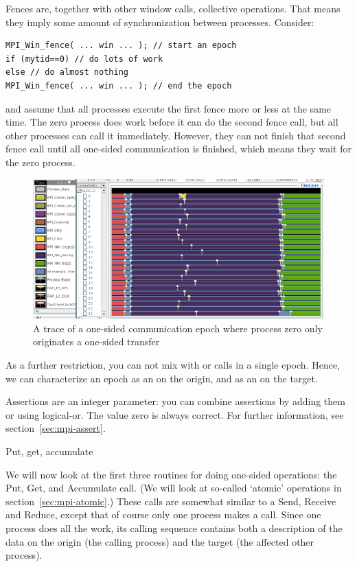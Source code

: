 Fences are, together with other window calls, collective operations. That means they 
imply some amount of synchronization between processes. Consider:
\begin{lstlisting}
MPI_Win_fence( ... win ... ); // start an epoch
if (mytid==0) // do lots of work
else // do almost nothing
MPI_Win_fence( ... win ... ); // end the epoch
\end{lstlisting}
and assume that all processes execute the first fence more or less at the same time.
The zero process does work before it can do the second fence call, but all other
processes can call it immediately. However, they can not finish that second fence call
until all one-sided communication is finished, which means they wait for the zero process.

\begin{figure}[ht]
  \includegraphics[scale=.4]{graphics/lonestar-twonode-put}%
  \caption{A trace of a one-sided communication epoch where process zero only originates
  a one-sided transfer}
  \label{fig:putblock}
\end{figure}

As a further restriction, you can not mix  with 
or  calls in a single epoch. Hence, we can
characterize an epoch as an  on the
origin, and as an  on the target.

Assertions are an integer parameter: you can combine assertions by
adding them or using logical-or.
The value zero is always correct. For further information, see
section~\ref{sec:mpi-assert}.


 {Put, get, accumulate}
\label{sec:putget}

We will now look at the first three routines for doing one-sided
operations: the Put, Get, and Accumulate call. (We will look at
so-called `atomic' operations in section~\ref{sec:mpi-atomic}.)
These calls are somewhat
similar to a Send, Receive and Reduce, except that of course only one
process makes a call.
Since one process does all the work, its calling sequence contains
both a description of the data on the origin (the calling process) and
the target (the affected other process).


